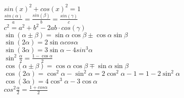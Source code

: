 $sin(x)^2 + cos(x)^2 = 1$\\
$\frac{sin(\alpha)}{a} = \frac{sin(\beta)}{b} = \frac{sin(\gamma)}{c}$\\
$c^2 = a^2 + b^2 -2ab \cdot cos(\gamma)$\\
$\sin(\alpha \pm \beta) = \sin \alpha \cos \beta \pm \cos \alpha \sin \beta$\\
$\sin(2 \alpha) = 2 \sin \alpha cos \alpha$\\
$\sin(3 \alpha) = 3 \sin \alpha - 4 sin^3 \alpha$\\
$\sin^2 \frac{\alpha}{2} = \frac{1 - \cos \alpha}{2}$\\
$\cos(\alpha \pm \beta) = \cos \alpha \cos \beta \mp \sin \alpha \sin \beta$\\
$\cos(2 \alpha) = \cos^2 \alpha - \sin^2 \alpha = 2 \cos^2 \alpha - 1 = 1 - 2 \sin^2 \alpha$\\
$\cos(3 \alpha) = 4 \cos^3 \alpha - 3 \cos \alpha$\\
$cos^2 \frac{\alpha}{2} = \frac{1 + cos \alpha}{2}$\\
